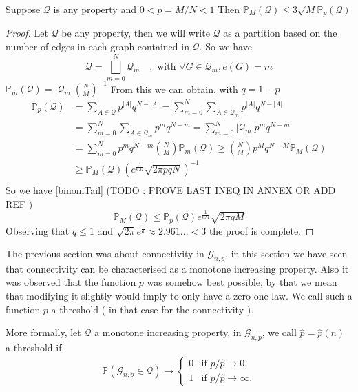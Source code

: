 \begin{theorem}\label{th:linkMP}
	Suppose $\mathcal{Q}$ is any property and $0 < p = M/N< 1$ 
	\newline
	Then $\mathbb{P}_M(\mathcal{Q}) \leq 3 \sqrt{M}\mathbb{P}_p(\mathcal{Q})$
\end{theorem}
\begin{proof}
	Let $\mathcal{Q}$ be any property, then we will write $\mathcal{Q}$ as a partition based on the number of edges in each graph contained in $\mathcal{Q}$.
	\newline
	So we have
	$$\mathcal{Q} = \bigsqcup_{m=0}^{N} \mathcal{Q}_m \quad, \text{ with } \forall G \in \mathcal{Q}_m, e(G) = m$$
	$\mathbb{P}_m(\mathcal{Q}) = |\mathcal{Q}_m| \binom{N}{M}^{-1}$
	From this we can obtain, with $q = 1 - p$
	\begin{align*}
		\mathbb{P}_p(\mathcal{Q})	&= \sum_{A \in \mathcal{Q}} p^{|A|}q^{N-|A|}
						= \sum_{m=0}^{N}\sum_{A \in \mathcal{Q}_m} p^{|A|}q^{N-|A|}\\
						&= \sum_{m=0}^{N}\sum_{A \in \mathcal{Q}_m} p^{m}q^{N-m}
						= \sum_{m=0}^{N}|\mathcal{Q}_m|p^{m}q^{N-m}\\
						&= \sum_{m=0}^N p^mq^{N-m}\binom{N}{M}\mathbb{P}_m(\mathcal{Q}) 
						\geq \binom{N}{M}p^Mq^{N-M}\mathbb{P}_M(\mathcal{Q}) \\
						&\geq \mathbb{P}_M(\mathcal{Q})(e^{\frac{1}{6M}}\sqrt{2\pi p q N})^{-1}\\
	\end{align*}
	So we have \ref{binomTail} (TODO : PROVE LAST INEQ IN ANNEX OR ADD REF )
	\begin{equation}
		\mathbb{P}_M(\mathcal{Q}) \leq  \mathbb{P}_p(\mathcal{Q})e^{\frac{1}{6M}}\sqrt{2\pi q M}
	\end{equation}
	Observing that $q \leq 1$ and $\sqrt{2\pi}e^{\frac{1}{6}} \approx 2.961... < 3$ the proof is complete.
\end{proof}
The previous section was about connectivity in $\mathcal{G}_{n,p}$, in this section we have seen that connectivity can be characterised as a monotone increasing property.
Also it was observed that the function $p$ was somehow best possible, by that we mean that modifying it slightly would imply to only have a zero-one law. 
We call such a function $p$ a threshold ( in that case for the connectivity ). 
\newline

More formally, let $\mathcal{Q}$ a monotone increasing property,  in $\mathcal{G}_{n, p}$, we call $\hat{p} = \hat{p}(n)$ a threshold if
\begin{align}
	\mathbb{P}(\mathcal{G}_{n,p} \in \mathcal{Q}) \rightarrow \left\{\begin{array}{rl}
										0 & \text{if } p / \hat{p} \to 0,\\
										1 & \text{if } p / \hat{p} \to \infty.
									 \end{array}
									\right.
\end{align}


